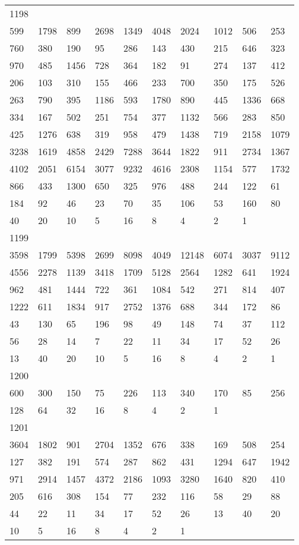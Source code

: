 \begin{longtable}{*{10}{l}}
1198&&&&&&&&&\\
599& 1798& 899& 2698& 1349& 4048& 2024& 1012& 506& 253\\
760& 380& 190& 95& 286& 143& 430& 215& 646& 323\\
970& 485& 1456& 728& 364& 182& 91& 274& 137& 412\\
206& 103& 310& 155& 466& 233& 700& 350& 175& 526\\
263& 790& 395& 1186& 593& 1780& 890& 445& 1336& 668\\
334& 167& 502& 251& 754& 377& 1132& 566& 283& 850\\
425& 1276& 638& 319& 958& 479& 1438& 719& 2158& 1079\\
3238& 1619& 4858& 2429& 7288& 3644& 1822& 911& 2734& 1367\\
4102& 2051& 6154& 3077& 9232& 4616& 2308& 1154& 577& 1732\\
866& 433& 1300& 650& 325& 976& 488& 244& 122& 61\\
184& 92& 46& 23& 70& 35& 106& 53& 160& 80\\
40& 20& 10& 5& 16& 8& 4& 2& 1& \\

1199&&&&&&&&&\\
3598& 1799& 5398& 2699& 8098& 4049& 12148& 6074& 3037& 9112\\
4556& 2278& 1139& 3418& 1709& 5128& 2564& 1282& 641& 1924\\
962& 481& 1444& 722& 361& 1084& 542& 271& 814& 407\\
1222& 611& 1834& 917& 2752& 1376& 688& 344& 172& 86\\
43& 130& 65& 196& 98& 49& 148& 74& 37& 112\\
56& 28& 14& 7& 22& 11& 34& 17& 52& 26\\
13& 40& 20& 10& 5& 16& 8& 4& 2& 1\\

1200&&&&&&&&&\\
600& 300& 150& 75& 226& 113& 340& 170& 85& 256\\
128& 64& 32& 16& 8& 4& 2& 1& \\

1201&&&&&&&&&\\
3604& 1802& 901& 2704& 1352& 676& 338& 169& 508& 254\\
127& 382& 191& 574& 287& 862& 431& 1294& 647& 1942\\
971& 2914& 1457& 4372& 2186& 1093& 3280& 1640& 820& 410\\
205& 616& 308& 154& 77& 232& 116& 58& 29& 88\\
44& 22& 11& 34& 17& 52& 26& 13& 40& 20\\
10& 5& 16& 8& 4& 2& 1& \\


\end{longtable}
